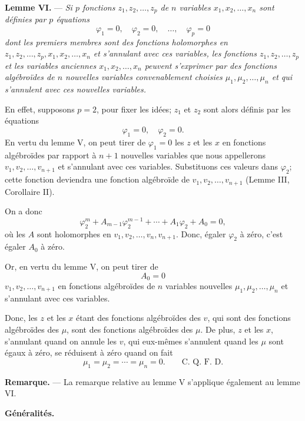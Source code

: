 \documentclass[11pt]{article}
\begin{document}
\medskip
\noindent\textbf{Lemme VI.} — \emph{Si $p$ fonctions $z_1,z_2,\ldots,z_p$ de $n$ variables $x_1,x_2,\ldots,x_n$ sont définies par $p$ équations}
\[
\varphi_1=0,
\quad \varphi_2=0,
\quad \ldots,
\quad \varphi_p=0
\]
\emph{dont les premiers membres sont des fonctions holomorphes en $z_1,z_2,\ldots,z_p,x_1,x_2,\ldots,x_n$ et s'annulant avec ces variables, les fonctions $z_1,z_2,\ldots,z_p$ et les variables anciennes $x_1,x_2,\ldots,x_n$ peuvent s'exprimer par des fonctions algébroïdes de $n$ nouvelles variables convenablement choisies $\mu_1,\mu_2,\ldots,\mu_n$ et qui s'annulent avec ces nouvelles variables.}

En effet, supposons $p=2$, pour fixer les idées; $z_1$ et $z_2$ sont alors définis par les équations
\[
\varphi_1=0,
\quad \varphi_2=0.
\]
En vertu du lemme V, on peut tirer de $\varphi_1=0$ les $z$ et les $x$ en fonctions algébroïdes par rapport à $n+1$ nouvelles variables que nous appellerons $v_1,v_2,\ldots,v_{n+1}$ et s'annulant avec ces variables. Substituons ces valeurs dans $\varphi_2$; cette fonction deviendra une fonction algébroïde de $v_1,v_2,\ldots,v_{n+1}$ (Lemme III, Corollaire II).

On a donc
\[
\varphi_2^m+A_{m-1}\varphi_2^{m-1}+\cdots+A_1\varphi_2+A_0=0,
\]
où les $A$ sont holomorphes en $v_1,v_2,\ldots,v_n,v_{n+1}$. Donc, égaler $\varphi_2$ à zéro, c'est égaler $A_0$ à zéro.

Or, en vertu du lemme V, on peut tirer de
\[
A_0=0
\]
$v_1,v_2,\ldots,v_{n+1}$ en fonctions algébroïdes de $n$ variables nouvelles $\mu_1,\mu_2,\ldots,\mu_n$ et s'annulant avec ces variables.

Donc, les $z$ et les $x$ étant des fonctions algébroïdes des $v$, qui sont des fonctions algébroïdes des $\mu$, sont des fonctions algébroïdes des $\mu$. De plus, $z$ et les $x$, s'annulant quand on annule les $v$, qui eux-mêmes s'annulent quand les $\mu$ sont égaux à zéro, se réduisent à zéro quand on fait
\[
\mu_1=\mu_2=\cdots=\mu_n=0. \qquad \text{C. Q. F. D.}
\]

\medskip
\noindent\textbf{Remarque.} — La remarque relative au lemme V s'applique également au lemme VI.

\begin{center}
\textbf{Généralités.}
\end{center}
\end{document}

